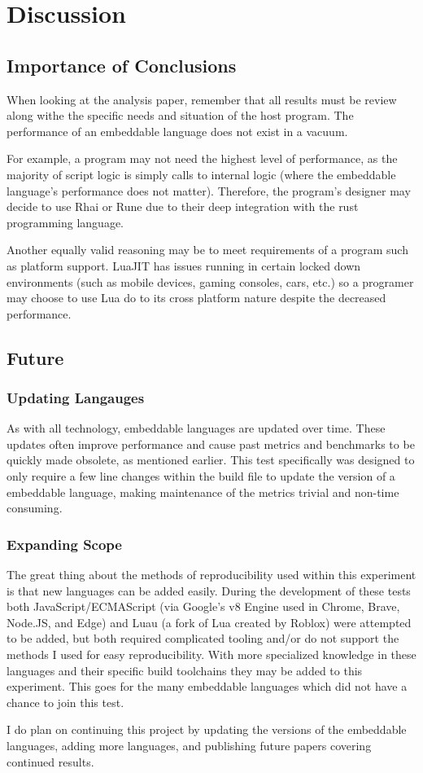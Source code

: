 \section{Discussion}

\subsection{Importance of Conclusions}
When looking at the analysis paper, remember that all results must be review along withe the specific needs and situation of the host program. The performance of an embeddable language does not exist in a vacuum.

For example, a program may not need the highest level of performance, as the majority of script logic is simply calls to internal logic (where the embeddable language's performance does not matter). Therefore, the program's designer may decide to use Rhai or Rune due to their deep integration with the rust programming language.

Another equally valid reasoning may be to meet requirements of a program such as platform support. LuaJIT has issues running in certain locked down environments\cite{luajit:consoles} (such as mobile devices, gaming consoles, cars, etc.) so a programer may choose to use Lua do to its cross platform nature despite the decreased performance.

\subsection{Future}

\subsubsection{Updating Langauges}
As with all technology, embeddable languages are updated over time. These updates often improve performance and cause past metrics and benchmarks to be quickly made obsolete, as mentioned earlier. This test specifically was designed to only require a few line changes within the build file to update the version of a embeddable language, making maintenance of the metrics trivial and non-time consuming.

\subsubsection{Expanding Scope}
The great thing about the methods of reproducibility used within this experiment is that new languages can be added easily. During the development of these tests both JavaScript/ECMAScript (via Google's v8 Engine\cite{v8} used in Chrome, Brave, Node.JS, and Edge) and Luau (a fork of Lua created by Roblox\cite{luau}) were attempted to be added, but both required complicated tooling and/or do not support the methods I used for easy reproducibility. With more specialized knowledge in these languages and their specific build toolchains they may be added to this experiment. This goes for the many embeddable languages which did not have a chance to join this test.

I do plan on continuing this project by updating the versions of the embeddable languages, adding more languages, and publishing future papers covering continued results.
